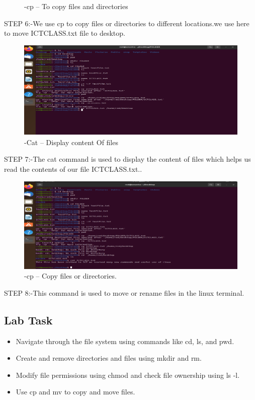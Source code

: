 \documentclass[a4paper,9pt]{article}
\begin{document}
\begin{enumerate}
\begin{figure}[H]
		\caption{-cp – To copy files and directories}
	\end{figure}
	STEP 6:-We use cp to copy files or directories to different locations.we use here to move
	ICTCLASS.txt file to desktop.
	\begin{figure}[H]
		\centering
		\includegraphics[width=0.8\linewidth]{3.7.png}
		\caption{-Cat – Display content Of files}
	\end{figure}
	STEP 7:-The cat command is used to display the content of files which helps us read the contents of
	our file ICTCLASS.txt..
	\begin{figure}[H]
		\centering
		\includegraphics[width=0.8\linewidth]{3.8.png}
		\caption{-cp – Copy files or directories.}
	\end{figure}
	STEP 8:-This command is used to move or rename files in the linux terminal.
	
\end{enumerate}

\subsection{Lab Task}

\begin{itemize}
	\item Navigate through the file system using commands like cd, ls, and pwd.
	\item Create and remove directories and files using mkdir and rm.
	\item Modify file permissions using chmod and check file ownership using ls -l.
	\item Use cp and mv to copy and move files.
\end{itemize}
\end{document}
